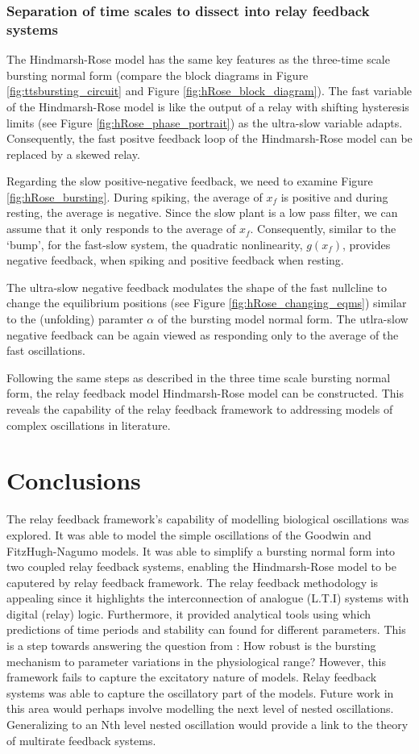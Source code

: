 \documentclass[a4paper, 12pt]{article}
\begin{document}
\subsubsection{Separation of time scales to dissect into relay feedback systems}
The Hindmarsh-Rose model has the same key features as the three-time scale bursting normal form (compare the block diagrams in Figure \ref{fig:ttsbursting_circuit} and Figure \ref{fig:hRose_block_diagram}). The fast variable of the Hindmarsh-Rose model is like the output of a relay with shifting hysteresis limits (see Figure \ref{fig:hRose_phase_portrait}) as the ultra-slow variable adapts. Consequently, the fast positve feedback loop of the Hindmarsh-Rose model can be replaced by a skewed relay. 

 Regarding the slow positive-negative feedback, we need to examine Figure \ref{fig:hRose_bursting}. During spiking, the average of $x_f$ is positive and during resting, the average is negative. Since the slow plant is a low pass filter, we can assume that it only responds to the average of $x_f$. Consequently, similar to the `bump', for the fast-slow system, the quadratic nonlinearity, $g(x_f)$, provides negative feedback, when spiking and positive feedback when resting.

The ultra-slow negative feedback modulates the shape of the fast nullcline to change the equilibrium positions (see Figure \ref{fig:hRose_changing_eqms}) similar to the (unfolding) paramter $\alpha$ of the bursting model normal form. The utlra-slow negative feedback can be again viewed as responding only to the average of the fast oscillations. 

Following the same steps as described in the three time scale bursting normal form, the relay feedback model Hindmarsh-Rose model can be constructed. This reveals the capability of the relay feedback framework to addressing models of complex oscillations in literature. 


\FloatBarrier
\section{Conclusions}
The relay feedback framework's capability of modelling biological oscillations was explored. It was able to model the simple oscillations of the Goodwin and FitzHugh-Nagumo models. It was able to simplify a bursting normal form into two coupled relay feedback systems, enabling the Hindmarsh-Rose model to be caputered by relay feedback framework. The relay feedback methodology is appealing since it highlights the interconnection of analogue (L.T.I) systems with digital (relay) logic. Furthermore, it provided analytical tools using which predictions of time periods and stability can found for different parameters. This is a step towards answering the question from \cite{rinzel}: How robust is the bursting mechanism to parameter variations in the physiological range?  However, this framework fails to capture the excitatory nature of models. Relay feedback systems was able to capture the oscillatory part of the models. Future work in this area would perhaps involve modelling the next level of nested oscillations. Generalizing to an Nth level nested oscillation would provide a link to the theory of multirate feedback systems.
\end{document}
